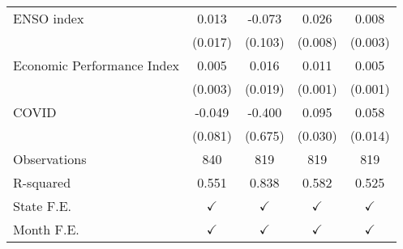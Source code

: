 \begin{tabular}{lcccc}
\addlinespace
ENSO index          &       0.013         &      -0.073         &       0.026\sym{**} &       0.008\sym{*}  \\
                    &     (0.017)         &     (0.103)         &     (0.008)         &     (0.003)         \\
\addlinespace
Economic Performance Index&       0.005         &       0.016         &       0.011\sym{***}&       0.005\sym{***}\\
                    &     (0.003)         &     (0.019)         &     (0.001)         &     (0.001)         \\
\addlinespace
COVID               &      -0.049         &      -0.400         &       0.095\sym{**} &       0.058\sym{***}\\
                    &     (0.081)         &     (0.675)         &     (0.030)         &     (0.014)         \\
\arrayrulecolor{black!10}\midrule
Observations        &         840         &         819         &         819         &         819         \\
R-squared           &       0.551         &       0.838         &       0.582         &       0.525         \\
State F.E.          &$\checkmark$         &$\checkmark$         &$\checkmark$         &$\checkmark$         \\
Month F.E.          &$\checkmark$         &$\checkmark$         &$\checkmark$         &$\checkmark$         \\



\end{tabular}
